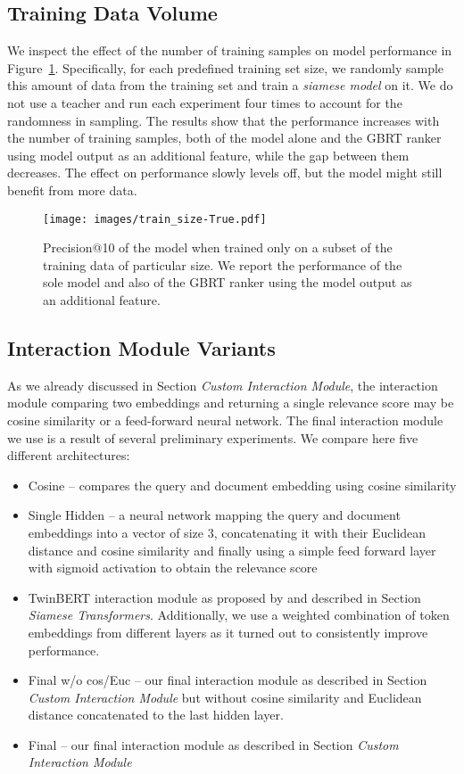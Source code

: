 \documentclass[letterpaper]{article} \usepackage{aaai22 }  \usepackage{times}  \usepackage{helvet}  \usepackage{courier}  \usepackage[hyphens]{url}  \usepackage{graphicx} \usepackage{amsmath,amsfonts,amssymb, mathabx,bm,bbm}
\begin{document}
\subsection{Training Data Volume}

We inspect the effect of the number of training samples on model performance in Figure~\ref{figure_train_size}. Specifically, for each predefined training set size, we randomly sample this amount of data from the training set and train a \textit{siamese model} on it. We do not use a teacher and run each experiment four times to account for the randomness in sampling. The results show that the performance increases with the number of training samples, both of the model alone and the GBRT ranker using model output as an additional feature, while the gap between them decreases. The effect on performance slowly levels off, but the model might still benefit from more data.

\begin{figure}[!htb]
    \centering
    \texttt{[image: images/train\_size-True.pdf]}    
    \caption{Precision@10 of the model when trained only on a subset of the training data of particular size. We report the performance of the sole model and also of the GBRT ranker using the model output as an additional feature.} \label{figure_train_size}
\end{figure}

\subsection{Interaction Module Variants}

As we already discussed in Section \textit{Custom Interaction Module}, the interaction module comparing two embeddings and returning a single relevance score may be cosine similarity or a feed-forward neural network. The final interaction module we use is a result of several preliminary experiments. We compare here five different architectures: 
\begin{itemize}
    \item Cosine -- compares the query and document embedding using cosine similarity
    \item Single Hidden -- a neural network mapping the query and document embeddings into a vector of size 3, concatenating it with their Euclidean distance and cosine similarity and finally using a simple feed forward layer with sigmoid activation to obtain the relevance score
    \item TwinBERT interaction module as proposed by \citet{twinbert} and described in Section \textit{Siamese Transformers}. Additionally, we use a weighted combination of token embeddings from different layers as it turned out to consistently improve performance.
    \item Final w/o cos/Euc -- our final interaction module as described in Section \textit{Custom Interaction Module} but without cosine similarity and Euclidean distance concatenated to the last hidden layer.
    \item Final -- our final interaction module as described in Section \textit{Custom Interaction Module}
\end{itemize}
\end{document}
